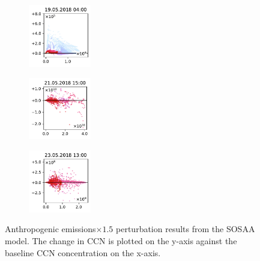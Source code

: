 \begin{figure}[H]
    \begin{subfigure}
        \centering
        \includegraphics[width=0.30\textwidth,valign=t]{evaluation/figures/perturbations/perturbation-19.05.2018:04.00-anthropogenic-mul-1.5.pdf}
    \end{subfigure}
    \begin{subfigure}
        \centering
        \includegraphics[width=0.30\textwidth,valign=t]{evaluation/figures/perturbations/perturbation-21.05.2018:15.00-anthropogenic-mul-1.5.pdf}
    \end{subfigure}
    \begin{subfigure}
        \centering
        \includegraphics[width=0.30\textwidth,valign=t]{evaluation/figures/perturbations/perturbation-23.05.2018:13.00-anthropogenic-mul-1.5.pdf}
    \end{subfigure}

    \caption[Anthropogenic emissions$\times 1.5$ perturbation SOSAA results]{Anthropogenic emissions$\times 1.5$ perturbation results from the SOSAA model. The change in CCN is plotted on the y-axis against the baseline CCN concentration on the x-axis.}
    \label{fig:sosaa-perturbation-anthropogenic-mul-1.5}
\end{figure}

